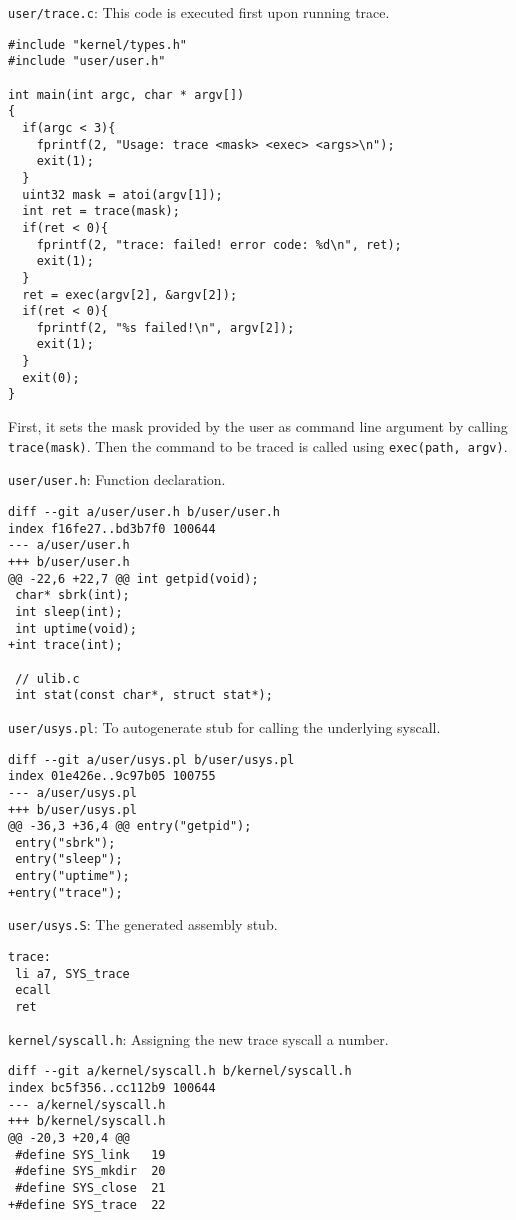 \documentclass{article}
\begin{document}
\texttt{user/trace.c}: This code is executed first upon running trace.
\begin{verbatim}
#include "kernel/types.h"
#include "user/user.h"

int main(int argc, char * argv[])
{
  if(argc < 3){
    fprintf(2, "Usage: trace <mask> <exec> <args>\n");
    exit(1);
  }
  uint32 mask = atoi(argv[1]);
  int ret = trace(mask);
  if(ret < 0){
    fprintf(2, "trace: failed! error code: %d\n", ret);
    exit(1);
  }
  ret = exec(argv[2], &argv[2]);
  if(ret < 0){
    fprintf(2, "%s failed!\n", argv[2]);
    exit(1);
  }
  exit(0);
}
\end{verbatim}
First, it sets the mask provided by the user as command line argument by calling \texttt{trace(mask)}. Then the command to be traced is called using \texttt{exec(path, argv)}.

\texttt{user/user.h}: Function declaration.
\begin{verbatim}
diff --git a/user/user.h b/user/user.h
index f16fe27..bd3b7f0 100644
--- a/user/user.h
+++ b/user/user.h
@@ -22,6 +22,7 @@ int getpid(void);
 char* sbrk(int);
 int sleep(int);
 int uptime(void);
+int trace(int);
 
 // ulib.c
 int stat(const char*, struct stat*);
\end{verbatim}

\texttt{user/usys.pl}: To autogenerate stub for calling the underlying syscall.
\begin{verbatim}
diff --git a/user/usys.pl b/user/usys.pl
index 01e426e..9c97b05 100755
--- a/user/usys.pl
+++ b/user/usys.pl
@@ -36,3 +36,4 @@ entry("getpid");
 entry("sbrk");
 entry("sleep");
 entry("uptime");
+entry("trace");
\end{verbatim}

\texttt{user/usys.S}: The generated assembly stub.
\begin{verbatim}
trace:
 li a7, SYS_trace
 ecall
 ret
\end{verbatim}

\texttt{kernel/syscall.h}: Assigning the new trace syscall a number.
\begin{verbatim}
diff --git a/kernel/syscall.h b/kernel/syscall.h
index bc5f356..cc112b9 100644
--- a/kernel/syscall.h
+++ b/kernel/syscall.h
@@ -20,3 +20,4 @@
 #define SYS_link   19
 #define SYS_mkdir  20
 #define SYS_close  21
+#define SYS_trace  22
\end{verbatim}
\end{document}
